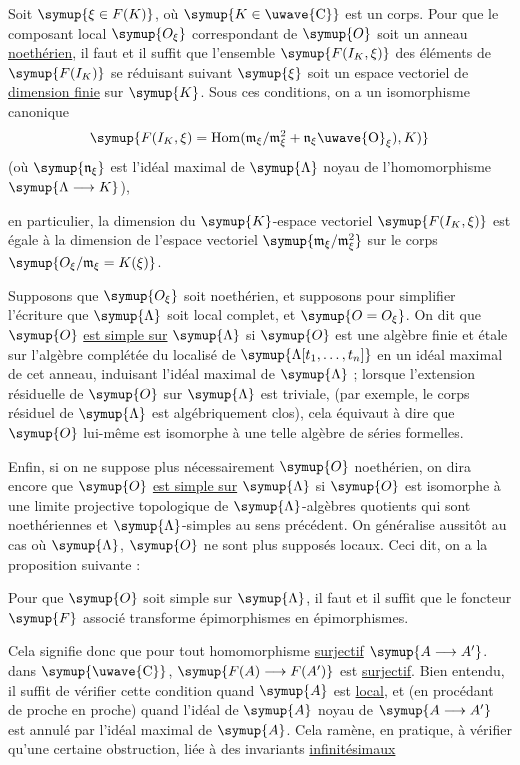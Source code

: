  Soit $\symup{\xi\in F(K)}$, où $\symup{K\in\text{\uwave{C}}}$ est un
corps. Pour que le composant local $\symup{O_\xi}$ correspondant de $\symup{O}$ soit un anneau \uline{noethérien}, il faut et il suffit que l'ensemble $\symup{F(I_K,\xi)}$ des éléments de
$\symup{F(I_K)}$ se réduisant suivant $\symup{\xi}$ soit un espace vectoriel de \uline{dimension finie} sur $\symup{K}$. Sous ces conditions, on a un isomorphisme canonique
\[
  \symup{F(I_K,\xi)=\operatorname{Hom}(\mathfrak m_\xi/\mathfrak m_\xi^2+\mathfrak n_\xi\text{\uwave{O}}_\xi),K)}
\]
(où $\symup{\mathfrak n_\xi}$ est l'idéal maximal de $\symup{\Lambda}$ noyau de l'homomorphisme $\symup{\Lambda\longrightarrow K}$),

en particulier, la dimension du $\symup{K}$-espace vectoriel $\symup{F(I_K,\xi)}$ est égale à
la dimension de l'espace vectoriel $\symup{\mathfrak m_\xi/\mathfrak m_\xi^2}$ sur le corps
$\symup{O_\xi/\mathfrak m_\xi=K(\xi)}$.

Supposons que $\symup{O_\xi}$ soit noethérien, et supposons pour simplifier l'écriture
que $\symup{\Lambda}$ soit local complet, et $\symup{O=O_\xi}$. On dit que $\symup{O}$ \uline{est simple sur} $\symup{\Lambda}$ si $\symup{O}$ est une algèbre finie et étale sur
l'algèbre complétée du localisé de $\symup{\Lambda[t_1,\ldots,t_n]}$ en un idéal
maximal de cet anneau, induisant l'idéal maximal de $\symup{\Lambda}$ ; lorsque
l'extension résiduelle de $\symup{O}$ sur $\symup{\Lambda}$ est triviale, (par exemple, le
corps résiduel de $\symup{\Lambda}$ est algébriquement clos), cela équivaut à dire que
$\symup{O}$ lui-même est isomorphe à une telle algèbre de séries formelles.

Enfin, si on ne suppose plus nécessairement $\symup{O}$ noethérien, on dira encore que
$\symup{O}$ \uline{est simple sur} $\symup{\Lambda}$ si $\symup{O}$ est isomorphe à une limite projective
topologique de $\symup{\Lambda}$-algèbres quotients qui sont noethériennes et
$\symup{\Lambda}$-simples au sens précédent. On généralise aussitôt au cas où
$\symup{\Lambda}$, $\symup{O}$ ne sont plus supposés locaux. Ceci dit, on a la proposition
suivante :

 Pour que $\symup{O}$ soit simple sur $\symup{\Lambda}$, il faut et il
suffit que le foncteur $\symup{F}$ associé transforme épimorphismes en épimorphismes.

Cela signifie donc que pour tout homomorphisme \uline{surjectif}
$\symup{A\longrightarrow A'}$. dans $\symup{\text{\uwave{C}}}$,
$\symup{F(A)\longrightarrow F(A')}$ est \uline{surjectif}. Bien entendu, il suffit de vérifier
cette condition quand $\symup{A}$ est \uline{local}, et (en procédant de proche en proche)
quand l'idéal de $\symup{A}$ noyau de $\symup{A\longrightarrow A'}$ est annulé par l'idéal
maximal de $\symup{A}$. Cela ramène, en pratique, à vérifier qu'une certaine
obstruction, liée à des invariants \uline{infinitésimaux}

